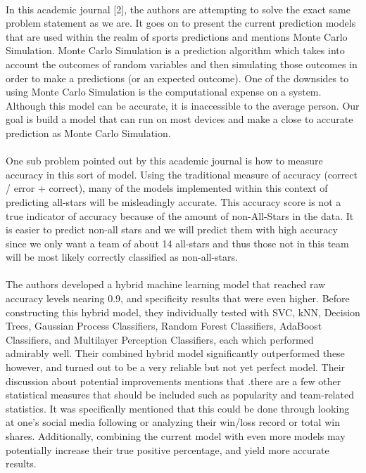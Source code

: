 \documentclass{article}
\begin{document}
\paragraph{}
In this academic journal [2], the authors are attempting to solve the exact same problem statement as we are. It goes on to present the current prediction models that are used within the realm of sports predictions and mentions Monte Carlo Simulation. Monte Carlo Simulation is a prediction algorithm which takes into account the outcomes of random variables and then simulating those outcomes in order to make a predictions (or an expected outcome). One of the downsides to using Monte Carlo Simulation is the computational expense on a system. Although this model can be accurate, it is inaccessible to the average person. Our goal is build a model that can run on most devices and make a close to accurate prediction as Monte Carlo Simulation. 
\paragraph{}
One sub problem pointed out by this academic journal is how to measure accuracy in this sort of model. Using the traditional measure of accuracy (correct / error + correct), many of the models implemented within this context of predicting all-stars will be misleadingly accurate. This accuracy score is not a true indicator of accuracy because of the amount of non-All-Stars in the data. It is easier to predict non-all stars and we will predict them with high accuracy since we only want a team of about 14 all-stars and thus those not in this team will be most likely correctly classified as non-all-stars.
\paragraph{}
The authors developed a hybrid machine learning model that reached raw accuracy levels nearing 0.9, and specificity results that were even higher. Before constructing this hybrid model, they individually tested with SVC, kNN, Decision Trees, Gaussian Process Classifiers, Random Forest Classifiers, AdaBoost Classifiers, and Multilayer Perception Classifiers, each which performed admirably well. Their combined hybrid model significantly outperformed these however, and turned out to be a very reliable but not yet perfect model. Their discussion about potential improvements mentions that .there are a few other statistical measures that should be included such as popularity and team-related statistics. It was specifically mentioned that this could be done through looking at one's social media following or analyzing their win/loss record or total win shares. Additionally, combining the current model with even more models may potentially increase their true positive percentage, and yield more accurate results. 
\end{document}
